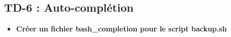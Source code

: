 \documentclass[12pt]{article}
\begin{document}
  \subsection{TD-6 : Auto-complétion}
\vspace{0.3cm}

\begin{itemize}
  \item \textbf{Créer un fichier bash\_completion pour le script backup.sh}
  \vspace{0.3cm}

\end{itemize}
\end{document}
